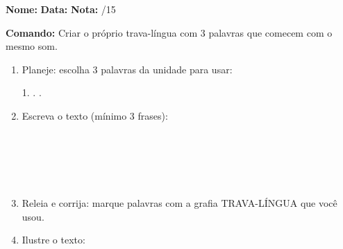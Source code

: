 \begin{exercicio}

\noindent\textbf{Nome:} \underline{\hspace{3.2cm}} \quad \textbf{Data:} \underline{\hspace{1.6cm}} \quad \textbf{Nota:} \underline{\hspace{0.9cm}}/15


\noindent\textbf{Comando:} Criar o próprio trava-língua com 3 palavras que comecem com o mesmo som.


\begin{enumerate}

  \item Planeje: escolha 3 palavras da unidade para usar:
  \begin{center}
  1. \underline{\hspace{3cm}} . \underline{\hspace{3cm}} . \underline{\hspace{3cm}}
  \end{center}

  \item Escreva o texto (mínimo 3 frases):
  \begin{center}
  \underline{\hspace{12cm}}\\\underline{\hspace{12cm}}\\\underline{\hspace{12cm}}\\\underline{\hspace{12cm}}\\\underline{\hspace{12cm}}
  \end{center}

  \item Releia e corrija: marque palavras com a grafia TRAVA-LÍNGUA que você usou.

  \item Ilustre o texto:
  \begin{center}
  \end{center}

\end{enumerate}

\end{exercicio}

